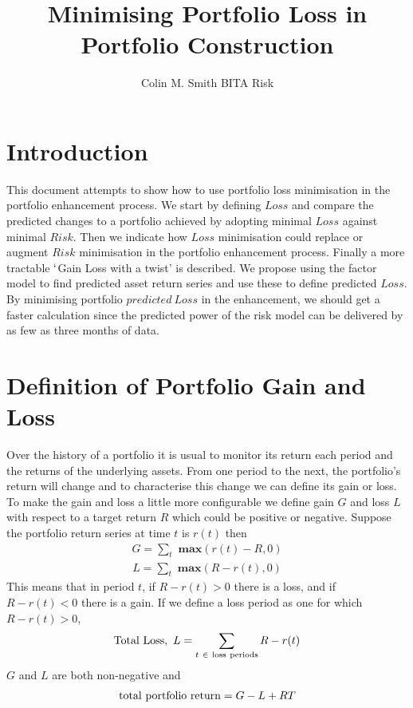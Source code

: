 \documentclass[12pt]{article}
\title{Minimising Portfolio Loss in Portfolio Construction}
\author{Colin M. Smith BITA Risk}
\begin{document}
\maketitle
\tableofcontents
\pagebreak
\doublespacing
\section{Introduction}
This document attempts to show how to use portfolio loss minimisation in the
portfolio enhancement process. We start by defining $Loss$ and compare
the predicted changes to a portfolio achieved by adopting minimal $Loss$ against minimal $Risk$. Then we indicate how 
$Loss$ minimisation could replace or augment $Risk$ minimisation in the portfolio enhancement process.
Finally a more tractable $`$Gain Loss with a twist' is described. We propose using
the factor model to find predicted asset return series and use these to define predicted $Loss$. 
By minimising portfolio $predicted\ Loss$ in the enhancement, we should get a faster calculation since 
the predicted 
power of the risk model can be delivered by as few as three months of data.

\section{Definition of Portfolio Gain and Loss}
Over the history of a portfolio it is usual to monitor its return each period and the returns of the underlying assets.
From one period  to the next, the portfolio's return will change and to characterise this change we can define its gain or loss.
To make the gain and loss a little more configurable we define 
gain $G$ and loss $L$ with respect to a target return $R$ which could be positive or negative.
Suppose the portfolio return series at time $t$ is $r(t)$ then
\begin{eqnarray}
    G = \sum_t {\textbf{ max} }(r(t) - R,0)
\end{eqnarray}
\begin{eqnarray}
    L = \sum_t {\textbf{ max} }(R-r(t),0)
\end{eqnarray}
This means that in period $t$, if $R-r(t) > 0$ there is a loss, and if $R-r(t) < 0$ there is a gain.
If we define a loss period as one for which $R-r(t) > 0$,
\begin{eqnarray}
  {\rm Total\ Loss},\ L= \sum_{t\ \in\ \rm loss\ periods} R-r(t)
\end{eqnarray}
$G$ and $L$ are both non-negative and
\begin{eqnarray}
 {\rm   total\ portfolio\ return}= G - L + RT
\end{eqnarray}
\end{document}
